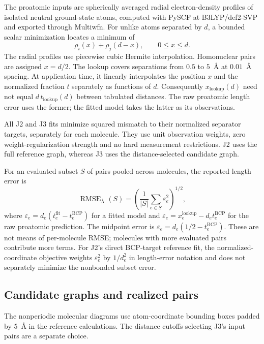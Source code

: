 The proatomic inputs are spherically averaged radial electron-density profiles of isolated neutral ground-state atoms, computed with PySCF at B3LYP/def2-SVP and exported through Multiwfn. For unlike atoms separated by $d$, a bounded scalar minimization locates a minimum of
\[
 \rho_i(x)+\rho_j(d-x),\qquad 0\le x\le d.
\]
The radial profiles use piecewise cubic Hermite interpolation. Homonuclear pairs are assigned $x=d/2$. The lookup covers separations from $0.5$ to $5$~\AA{} at $0.01$~\AA{} spacing. At application time, it linearly interpolates the position $x$ and the normalized fraction $t$ separately as functions of $d$. Consequently $x_{\mathrm{lookup}}(d)$ need not equal $d\,t_{\mathrm{lookup}}(d)$ between tabulated distances. The raw proatomic length error uses the former; the fitted model takes the latter as its observations.

All J2 and J3 fits minimize squared mismatch to their normalized separator targets, separately for each molecule. They use unit observation weights, zero weight-regularization strength and no hard measurement restrictions. J2 uses the full reference graph, whereas J3 uses the distance-selected candidate graph.

For an evaluated subset $S$ of pairs pooled across molecules, the reported length error is
\begin{equation}
 \operatorname{RMSE}_{\!\text{\AA}}(S)
 =\left(\frac{1}{|S|}\sum_{e\in S}\varepsilon_e^2\right)^{1/2},
 \label{eq:molecular-pooled-rmse}
\end{equation}
where $\varepsilon_e=d_e(t_e^{\mathrm{fit}}-t_e^{\mathrm{BCP}})$ for a fitted model and $\varepsilon_e=x_e^{\mathrm{lookup}}-d_e t_e^{\mathrm{BCP}}$ for the raw proatomic prediction. The midpoint error is $\varepsilon_e=d_e(1/2-t_e^{\mathrm{BCP}})$. These are not means of per-molecule RMSE; molecules with more evaluated pairs contribute more terms. For J2's direct BCP-target reference fit, the normalized-coordinate objective weights $\varepsilon_e^2$ by $1/d_e^2$ in length-error notation and does not separately minimize the nonbonded subset error.

\subsection{Candidate graphs and realized pairs}
\label{app:molecular-candidates}

The nonperiodic molecular diagrams use atom-coordinate bounding boxes padded by $5$~\AA{} in the reference calculations. The distance cutoffs selecting J3's input pairs are a separate choice.

